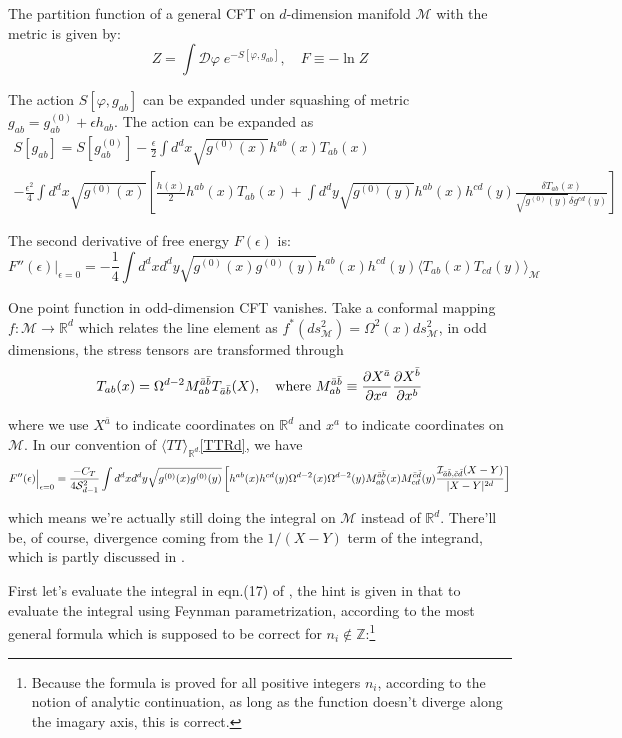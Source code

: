 \documentclass[12pt, a4paper]{article}
\numberwithin{equation}{section}
\newcommand{\be}{\begin{equation}}
\newcommand{\ee}{\end{equation}}
\newcommand{\cD}{\mathcal{D}}
\newcommand{\cS}{\mathcal{S}}
\newcommand{\cM}{\mathcal{M}}
\newcommand{\cI}{\mathcal{I}}
\begin{document}
	The partition function of a general CFT on $d$-dimension manifold $\cM$ with the metric is given by:
\be
	Z = \int \cD \varphi\; e^{-S[\varphi,g_{ab}]},\quad F \equiv -\ln Z
\ee
	
	The action $S[\varphi,g_{ab}]$ can be expanded under squashing of metric $g_{ab} = g_{ab}^{(0)} + \epsilon h_{ab}$. The action can be expanded as
\be
\begin{aligned}
		S[g_{ab}] = S[g_{ab}^{(0)}] -\frac{\epsilon}{2}\int d^dx \sqrt{g^{(0)}(x)}h^{ab}(x)T_{ab}(x)\\
		 - \frac{\epsilon^2}{4}\int d^dx\sqrt{g^{(0)}(x)}\left[\frac{h(x)}{2}h^{ab}(x)T_{ab}(x)+\int d^dy \sqrt{g^{(0)}(y)}h^{ab}(x)h^{cd}(y)\frac{\delta T_{ab}(x)}{\sqrt{g^{(0)}(y)}\delta g^{cd}(y)}\right]
\end{aligned}
\ee

	The second derivative of free energy $F(\epsilon)$ is:
\be
	F''(\epsilon)\Big|_{\epsilon=0} = -\frac{1}{4}\int d^dx d^dy\sqrt{g^{(0)}(x)g^{(0)}(y)} h^{ab}(x)h^{cd}(y)\langle T_{ab}(x)T_{cd}(y)\rangle_\cM
\ee

	One point function in odd-dimension CFT vanishes. Take a conformal mapping $f:\cM\rightarrow \mathbb{R}^d$ which relates the line element as $f^*(ds^2_\cM) = \Omega^2(x)ds^2_\cM$, in odd dimensions, the stress tensors are transformed through
\be
	T_{ab}(x) = \Omega^{d-2}M^{\bar{a}\bar{b}}_{ab}T_{\bar{a}\bar{b}}(X),\quad {\rm where} \ M^{\bar{a}\bar{b}}_{ab}\equiv \frac{\partial X^{\bar{a}}}{\partial x^a}\frac{\partial X^{\bar{b}}}{\partial x^b}
\ee
	
	where we use $X^{\bar{a}}$ to indicate coordinates on $\mathbb{R}^d$ and $x^a$ to indicate coordinates on $\cM$. In our convention of $\langle TT \rangle_{\mathbb{R}^d}$\ref{TTRd}, we have
\be
\small
		F''(\epsilon)\Big|_{\epsilon=0} = \frac{-C_T}{4\cS_{d-1}^2}\int d^dx d^dy\sqrt{g^{(0)}(x)g^{(0)}(y)}\left[h^{ab}(x)h^{cd}(y)\Omega^{d-2}(x)\Omega^{d-2}(y)M_{ab}^{\bar{a}\bar{b}}(x)M_{cd}^{\bar{c}\bar{d}}(y)\frac{\cI_{\bar{a}\bar{b},\bar{c}\bar{d}}(X-Y)}{|X-Y|^{2d}}\right]
\label{MasterIntegral}
\ee
	
	which means we're actually still doing the integral on $\cM$ instead of $\mathbb{R}^d$. There'll be, of course, divergence coming from the $1/{(X-Y)}$ term of the integrand, which is partly discussed in \cite{Klebanov:2011fs}.
	
	First let's evaluate the integral in eqn.(17) of \cite{Klebanov:2011fs}, the hint is given in \cite{Cardy:1988fd} that to evaluate the integral using Feynman parametrization, according to the most general formula which is supposed to be correct for $n_i\notin \mathbb{Z}$:\footnote{Because the formula is proved for all positive integers $n_i$, according to the notion of analytic continuation, as long as the function doesn't diverge along the imagary axis, this is correct.} 
\end{document}
